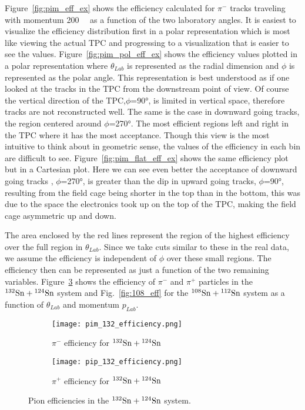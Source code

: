 Figure~\ref{fig:pim_eff_ex} shows the efficiency calculated for $\pi^-$ tracks traveling with momentum \SI{200}{\mega\eVperc} as a function of the two laboratory angles. It is easiest to visualize the efficiency distribution first in a polar representation which is most like viewing the actual TPC and progressing to a visualization that is easier to see the values. Figure~\ref{fig:pim_pol_eff_ex} shows the efficiency values plotted in a polar representation where $\theta_{Lab}$ is represented as the radial dimension and $\phi$ is represented as the polar angle. This representation is best understood as if one looked at the tracks in the TPC from the downstream point of view. Of course the vertical direction of the TPC,$\phi$=\ang{90}, is limited in vertical space, therefore tracks are not reconstructed well. The same is the case in downward going tracks, the region centered around $\phi$=\ang{270}. The most efficient regions left and right in the TPC where it has the most acceptance. Though this view is the most intuitive to think about in geometric sense, the values of the efficiency in each bin are difficult to see. Figure~\ref{fig:pim_flat_eff_ex} shows the same efficiency plot but in a Cartesian plot. Here we can see even better the acceptance of downward going tracks , $\phi$=\ang{270}, is greater than the dip in upward going tracks, $\phi$=\ang{90}, resulting from the field cage being shorter in the top than in the bottom, this was due to the space the electronics took up on the top of the TPC, making the field cage asymmetric up and down. 

The area enclosed by the red lines represent the region of the highest efficiency over the full region in $\theta_{Lab}$.  Since we take cuts similar to these in the real data, we assume the efficiency is independent of $\phi$ over these small regions. The efficiency then can be represented as just a function of the two remaining variables. Figure~\ref{fig:132_eff} shows the efficiency of $\pi^-$ and $\pi^+$ particles in the ${}^{132}\mathrm{Sn} + {}^{124}\mathrm{Sn}$ system and Fig.~\ref{fig:108_eff} for the ${}^{108}\mathrm{Sn} + {}^{112}\mathrm{Sn}$ system as a function of $\theta_{Lab}$ and momentum $p_{Lab}$. 



\begin{figure}[!htb]
    \centering
    \begin{subfigure}[t]{0.49\textwidth}
        \centering
        \texttt{[image: pim\_132\_efficiency.png]}
        \caption{$\pi^-$ efficiency for ${}^{132}\mathrm{Sn} + {}^{124}\mathrm{Sn}$} \label{fig:pim_132_eff}
    \end{subfigure}
    \hfill
    \begin{subfigure}[t]{.49\textwidth}
        \centering
        \texttt{[image: pip\_132\_efficiency.png]} 
        \caption{$\pi^+$ efficiency for ${}^{132}\mathrm{Sn} + {}^{124}\mathrm{Sn}$} \label{fig:pip_132_eff}
    \end{subfigure}
  
    \caption{Pion efficiencies in the ${}^{132}\mathrm{Sn} + {}^{124}\mathrm{Sn}$ system. }
\label{fig:132_eff}
\end{figure}



